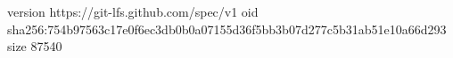 version https://git-lfs.github.com/spec/v1
oid sha256:754b97563c17e0f6ec3db0b0a07155d36f5bb3b07d277c5b31ab51e10a66d293
size 87540
